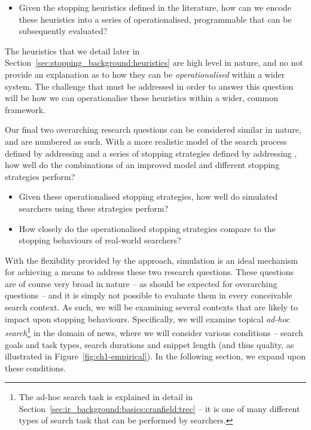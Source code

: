\begin{itemize}
    \item[]{ Given the stopping heuristics defined in the literature, how can we encode these heuristics into a series of operationalised, programmable  that can be subsequently evaluated?}
\end{itemize}

The heuristics that we detail later in Section~\ref{sec:stopping_background:heuristics} are high level in nature, and no not provide an explanation as to how they can be \emph{operationalised} within a wider system. The challenge that must be addressed in order to answer this question will be how we can operationalise these heuristics within a wider, common framework.

Our final two overarching research questions can be considered similar in nature, and are numbered as such. With a more realistic model of the search process defined by addressing  and a series of stopping strategies defined by addressing , how well do the combinations of an improved model and different stopping strategies perform?

\begin{itemize}
    \item[]{ Given these operationalised stopping strategies, how well do simulated searchers using these strategies perform?}
    \item[]{ How closely do the operationalised stopping strategies compare to the stopping behaviours of real-world searchers?}
\end{itemize}

With the flexibility provided by the approach, simulation is an ideal mechanism for achieving a means to address these two research questions. These questions are of course very broad in nature -- as should be expected for overarching questions -- and it is simply not possible to evaluate them in every conceivable search context. As such, we will be examining several contexts that are likely to impact upon stopping behaviours. Specifically, we will examine topical \emph{ad-hoc search}\footnote{The ad-hoc search task is explained in detail in Section~\ref{sec:ir_background:basics:cranfield:trec} -- it is one of many different types of search task that can be performed by searchers.} in the domain of news, where we will consider various conditions -- search goals and task types, search durations and snippet length (and thus quality, as illustrated in Figure~\ref{fig:ch1-empirical}). In the following section, we expand upon these conditions.

